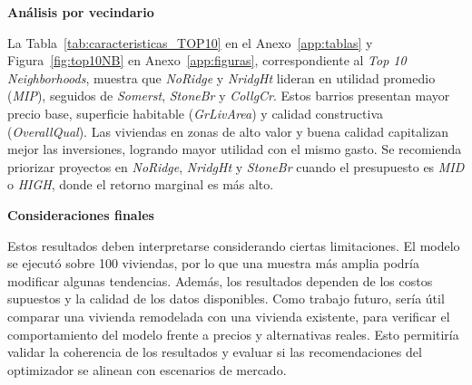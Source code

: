 \noindent\textbf{Análisis por vecindario}

La Tabla~\ref{tab:caracteristicas_TOP10} en el Anexo~\ref{app:tablas} y Figura~\ref{fig:top10NB} en Anexo~\ref{app:figuras}, correspondiente al \textit{Top 10 Neighborhoods}, muestra que \textit{NoRidge} y \textit{NridgHt} lideran en utilidad promedio (\textit{MIP}), seguidos de \textit{Somerst}, \textit{StoneBr} y \textit{CollgCr}. Estos barrios presentan mayor precio base, superficie habitable (\textit{GrLivArea}) y calidad constructiva (\textit{OverallQual}). Las viviendas en zonas de alto valor y buena calidad capitalizan mejor las inversiones, logrando mayor utilidad con el mismo gasto.  
Se recomienda priorizar proyectos en \textit{NoRidge}, \textit{NridgHt} y \textit{StoneBr} cuando el presupuesto es \textit{MID} o \textit{HIGH}, donde el retorno marginal es más alto.

\noindent\textbf{Consideraciones finales}

Estos resultados deben interpretarse considerando ciertas limitaciones. El modelo se ejecutó sobre 100 viviendas, por lo que una muestra más amplia podría modificar algunas tendencias. Además, los resultados dependen de los costos supuestos y la calidad de los datos disponibles. Como trabajo futuro, sería útil comparar una vivienda remodelada con una vivienda existente, para verificar el comportamiento del modelo frente a precios y alternativas reales. Esto permitiría validar la coherencia de los resultados y evaluar si las recomendaciones del optimizador se alinean con escenarios de mercado.\\